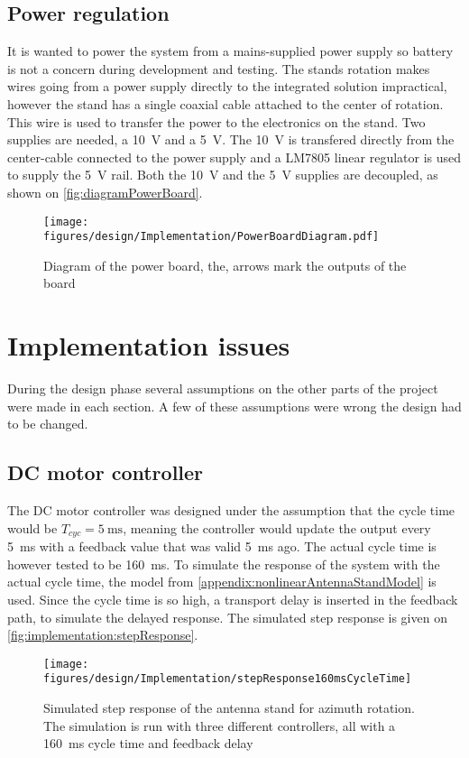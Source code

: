 \subsection{Power regulation}
It is wanted to power the system from a mains-supplied power supply so battery is not a concern during development and testing. The stands rotation makes wires going from a power supply directly to the integrated solution impractical, however the stand has a single coaxial cable attached to the center of rotation. This wire is used to transfer the power to the electronics on the stand.
Two supplies are needed, a \SI{10}{\volt} and a \SI{5}{\volt}. The \SI{10}{\volt} is transfered directly from the center-cable connected to the power supply and a LM7805 linear regulator is used to supply the \SI{5}{\volt} rail. Both the \SI{10}{\volt} and the \SI{5}{\volt} supplies are decoupled, as shown on \autoref{fig:diagramPowerBoard}. 
\begin{figure}[h]
	\centering
	\texttt{[image: figures/design/Implementation/PowerBoardDiagram.pdf]}
	\caption{Diagram of the power board, the, arrows mark the outputs of the board}\label{fig:diagramPowerBoard}
\end{figure}

\section{Implementation issues}
During the design phase several assumptions on the other parts of the project were made in each section. A few of these assumptions were wrong the design had to be changed.

\subsection{DC motor controller}
The DC motor controller was designed under the assumption that the cycle time would be $T_{cyc} = \SI{5}{\milli\second}$, meaning the controller would update the output every \SI{5}{\milli\second} with a feedback value that was valid \SI{5}{\milli\second} ago. The actual cycle time is however tested to be \SI{160}{\milli\second}. To simulate the response of the system with the actual cycle time, the model from \autoref{appendix:nonlinearAntennaStandModel} is used. Since the cycle time is so high, a transport delay is inserted in the feedback path, to simulate the delayed response. The simulated step response is given on \autoref{fig:implementation:stepResponse}.
\begin{figure} [h]
\centering
\texttt{[image: figures/design/Implementation/stepResponse160msCycleTime]}
\caption{Simulated step response of the antenna stand for azimuth rotation. The simulation is run with three different controllers, all with a \SI{160}{\milli\second} cycle time and feedback delay}\label{fig:implementation:stepResponse}
\end{figure}

